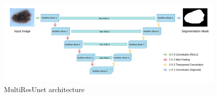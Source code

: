 \begin{figure}
    \centerline{\includegraphics[width=1\columnwidth]{04-methodology/figures/multiresunet-architecture.png}}
    \caption{MultiResUnet architecture}
    \label{fig:multiresunet-architecture}
\end{figure}